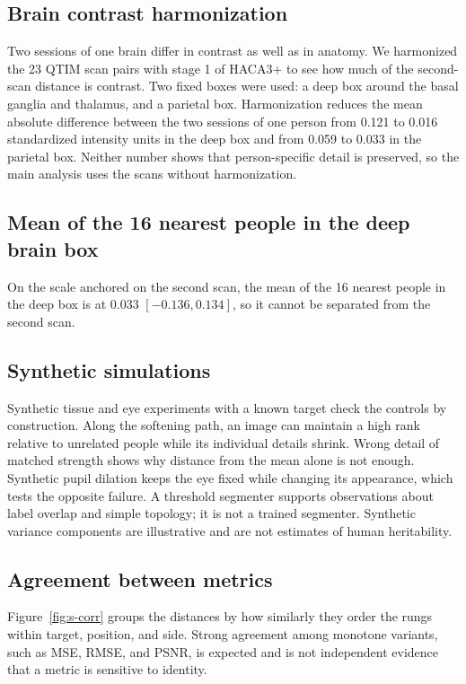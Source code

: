\subsection{Brain contrast harmonization}
Two sessions of one brain differ in contrast as well as in anatomy.
We harmonized the 23 QTIM scan pairs with stage 1 of HACA3+ to see how much of the second-scan distance is contrast.
Two fixed boxes were used: a deep box around the basal ganglia and thalamus, and a parietal box.
Harmonization reduces the mean absolute difference between the two sessions of one person from 0.121 to 0.016 standardized intensity units in the deep box and from 0.059 to 0.033 in the parietal box.
Neither number shows that person-specific detail is preserved, so the main analysis uses the scans without harmonization.

\subsection{Mean of the 16 nearest people in the deep brain box}
On the scale anchored on the second scan, the mean of the 16 nearest people in the deep box is at 0.033 $[-0.136, 0.134]$, so it cannot be separated from the second scan.

\subsection{Synthetic simulations}
Synthetic tissue and eye experiments with a known target check the controls by construction.
Along the softening path, an image can maintain a high rank relative to unrelated people while its individual details shrink.
Wrong detail of matched strength shows why distance from the mean alone is not enough.
Synthetic pupil dilation keeps the eye fixed while changing its appearance, which tests the opposite failure.
A threshold segmenter supports observations about label overlap and simple topology; it is not a trained segmenter.
Synthetic variance components are illustrative and are not estimates of human heritability.

\subsection{Agreement between metrics}
Figure~\ref{fig:s-corr} groups the distances by how similarly they order the rungs within target, position, and side.
Strong agreement among monotone variants, such as MSE, RMSE, and PSNR, is expected and is not independent evidence that a metric is sensitive to identity.

